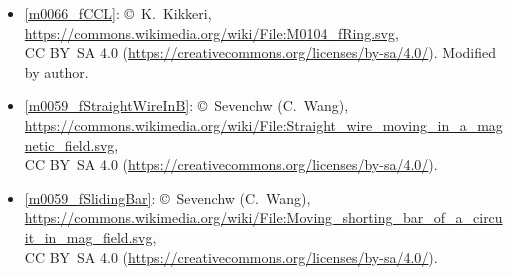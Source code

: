 \begin{itemize}
\item[Fig.] \label{m0066_fCCL_Credit}
  \ref{m0066_fCCL}:
  \copyright~K.\ Kikkeri, 
  \url{https://commons.wikimedia.org/wiki/File:M0104_fRing.svg},\\ 
  CC BY~SA 4.0 (\url{https://creativecommons.org/licenses/by-sa/4.0/}).
  Modified by author.

\item[Fig.] \label{m0059_fStraightWireInB_Credit}
  \ref{m0059_fStraightWireInB}:
  \copyright~Sevenchw (C.\ Wang), 
  \url{https://commons.wikimedia.org/wiki/File:Straight_wire_moving_in_a_magnetic_field.svg},\\ 
  CC BY~SA 4.0 (\url{https://creativecommons.org/licenses/by-sa/4.0/}).

\item[Fig.] \label{m0059_fSlidingBar_Credit}
  \ref{m0059_fSlidingBar}:
  \copyright~Sevenchw (C.\ Wang), 
  \url{https://commons.wikimedia.org/wiki/File:Moving_shorting_bar_of_a_circuit_in_mag_field.svg},\\ 
  CC BY~SA 4.0 (\url{https://creativecommons.org/licenses/by-sa/4.0/}).

\end{itemize}

\twocolumn
